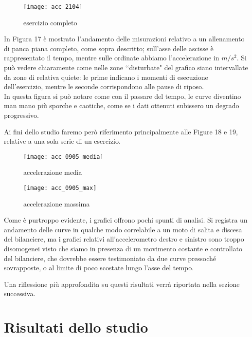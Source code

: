 \documentclass[fleqn,10pt]{SelfArx} %
\begin{document}
\begin{figure}[htb]\centering
	\texttt{[image: acc\_2104]}
	\caption{esercizio completo}
	\label{fig:zoom accelerazione 2104}
\end{figure}

\noindent
In Figura 17 è mostrato l'andamento delle misurazioni relativo a un allenamento di panca piana completo, come sopra descritto; sull’asse 
delle ascisse è rappresentato il tempo, mentre sulle ordinate abbiamo l’accelerazione in $ m/s^2 $. Si può vedere 
chiaramente come nelle zone \lq\lq disturbate" del grafico siano intervallate da zone di relativa quiete: le prime indicano i momenti di 
esecuzione dell'esercizio, mentre le seconde corrispondono alle pause di riposo.\\
In questa figura si può notare come con il passare del tempo, le curve diventino man mano più sporche e caotiche, come se i dati ottenuti 
subissero un degrado progressivo.

\noindent Ai fini dello studio faremo però riferimento principalmente alle Figure 18 e 19, relative a una sola serie di un esercizio.

\begin{figure}[htb]\centering
	\texttt{[image: acc\_0905\_media]}
	\caption{accelerazione media}
	\label{fig:zoom accelerazione 0905}
\end{figure}
\begin{figure}[htb]\centering
	\texttt{[image: acc\_0905\_max]}
	\caption{accelerazione massima}
	\label{fig:zoom accelerazione 0905}
\end{figure}

Come è purtroppo evidente, i grafici offrono pochi spunti di analisi. Si registra un andamento delle curve in qualche modo correlabile  
a un moto di salita e discesa del bilanciere, ma i grafici relativi all'accelerometro destro e sinistro sono troppo disomogenei 
visto che siamo in presenza di un movimento costante e controllato del bilanciere, che dovrebbe essere testimoniato da due curve pressoché 
sovrapposte, o al limite di poco scostate lungo l'asse del tempo.

\noindent
Una riflessione più approfondita su questi risultati verrà riportata nella sezione successiva.

\section{Risultati dello studio}
\end{document}

